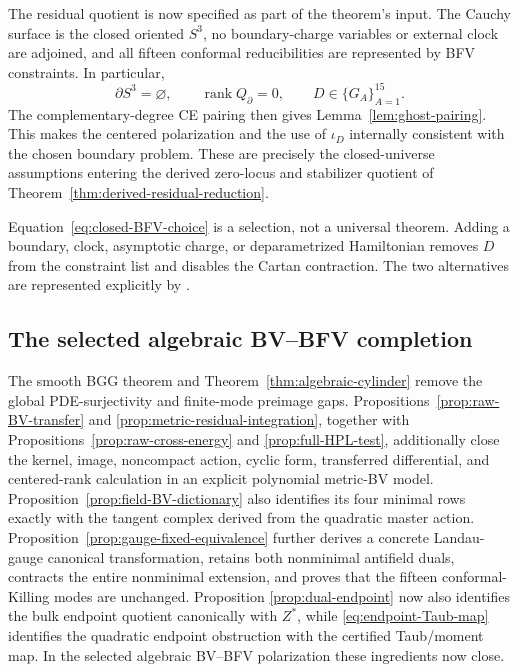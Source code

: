 \documentclass[11pt]{article}
\theoremstyle{definition}
\theoremstyle{remark}
\newcommand{\rank}{\operatorname{rank}}
\begin{document}
The residual quotient is now specified as part of the theorem's input.  The
Cauchy surface is the closed oriented $S^3$, no boundary-charge variables or
external clock are adjoined, and all fifteen conformal reducibilities are
represented by BFV constraints.  In particular,
\begin{equation}\label{eq:closed-BFV-choice}
 \partial S^3=\varnothing,\qquad
 \rank Q_{\partial}=0,\qquad
 D\in\{G_A\}_{A=1}^{15}.
\end{equation}
The complementary-degree CE pairing then gives
Lemma~\ref{lem:ghost-pairing}.  This makes the centered polarization and the
use of $\iota_D$ internally consistent with the chosen boundary problem.
These are precisely the closed-universe assumptions entering the derived
zero-locus and stabilizer quotient of
Theorem~\ref{thm:derived-residual-reduction}.

Equation~\eqref{eq:closed-BFV-choice} is a selection, not a universal
theorem.  Adding a boundary, clock, asymptotic charge, or deparametrized
Hamiltonian removes $D$ from the constraint list and disables the Cartan
contraction.  The two alternatives are represented explicitly by
.

\subsection{The selected algebraic BV--BFV completion}

The smooth BGG theorem and Theorem~\ref{thm:algebraic-cylinder} remove the
global PDE-surjectivity and finite-mode preimage gaps.
Propositions~\ref{prop:raw-BV-transfer} and
\ref{prop:metric-residual-integration}, together with
Propositions~\ref{prop:raw-cross-energy} and \ref{prop:full-HPL-test},
additionally close the kernel, image, noncompact action, cyclic form,
transferred differential, and centered-rank calculation in an explicit
polynomial metric-BV model.  Proposition~\ref{prop:field-BV-dictionary}
also identifies its four minimal rows exactly with the tangent complex
derived from the quadratic master action.
Proposition~\ref{prop:gauge-fixed-equivalence} further derives a concrete
Landau-gauge canonical transformation, retains both nonminimal antifield
duals, contracts the entire nonminimal extension, and proves that the
fifteen conformal-Killing modes are unchanged.  Proposition
\ref{prop:dual-endpoint} now also identifies the bulk endpoint quotient
canonically with $Z^*$, while \eqref{eq:endpoint-Taub-map} identifies the
quadratic endpoint obstruction with the certified Taub/moment map.  In the
selected algebraic BV--BFV polarization these ingredients now close.
\end{document}
